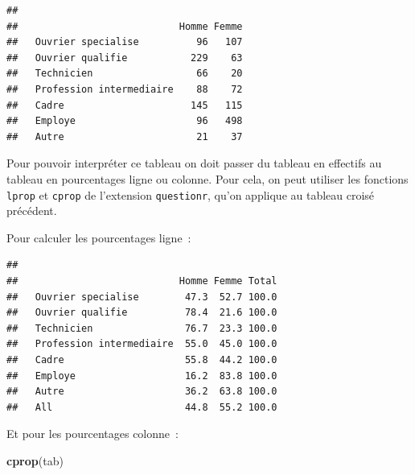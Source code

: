 \documentclass[12pt,]{book}
\newenvironment{Shaded}{\begin{snugshade}}{\end{snugshade}}
\newcommand{\KeywordTok}[1]{\textcolor[rgb]{0.27,0.27,0.27}{\textbf{#1}}}
\newcommand{\NormalTok}[1]{#1}
\newcommand{\OperatorTok}[1]{\textcolor[rgb]{0.43,0.43,0.43}{\textbf{#1}}}
\newcommand{\StringTok}[1]{\textcolor[rgb]{0.5,0.5,0.5}{#1}}
\begin{document}
\begin{Shaded}
\end{Shaded}

\begin{verbatim}
##                           
##                            Homme Femme
##   Ouvrier specialise          96   107
##   Ouvrier qualifie           229    63
##   Technicien                  66    20
##   Profession intermediaire    88    72
##   Cadre                      145   115
##   Employe                     96   498
##   Autre                       21    37
\end{verbatim}

Pour pouvoir interpréter ce tableau on doit passer du tableau en effectifs au tableau en pourcentages ligne ou colonne. Pour cela, on peut utiliser les fonctions \texttt{lprop} et \texttt{cprop} de l'extension \texttt{questionr}, qu'on applique au tableau croisé précédent.

Pour calculer les pourcentages ligne~:

\begin{Shaded}
\end{Shaded}

\begin{verbatim}
##                           
##                            Homme Femme Total
##   Ouvrier specialise        47.3  52.7 100.0
##   Ouvrier qualifie          78.4  21.6 100.0
##   Technicien                76.7  23.3 100.0
##   Profession intermediaire  55.0  45.0 100.0
##   Cadre                     55.8  44.2 100.0
##   Employe                   16.2  83.8 100.0
##   Autre                     36.2  63.8 100.0
##   All                       44.8  55.2 100.0
\end{verbatim}

Et pour les pourcentages colonne~:

\begin{Shaded}
\begin{Highlighting}[]
\KeywordTok{cprop}\NormalTok{(tab)}
\end{Highlighting}
\end{Shaded}
\end{document}
